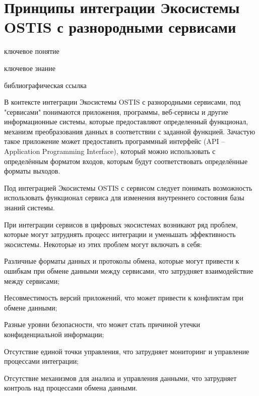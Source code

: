 \section{Принципы интеграции Экосистемы OSTIS с разнородными сервисами}
{\label{sec_integration_services}} 

\begin{SCn}

    \bigskip
    
    \begin{scnrelfromlist}{ключевое понятие}
    \end{scnrelfromlist}
    
    \bigskip
    
    \begin{scnrelfromlist}{ключевое знание}
    \end{scnrelfromlist}
    
    \bigskip
    
    \begin{scnrelfromlist}{библиографическая ссылка}
    \end{scnrelfromlist}
    
\end{SCn}

В контексте интеграции Экосистемы OSTIS с разнородными сервисами, под "сервисами" понимаются приложения, программы, веб-сервисы и другие информационные системы, которые предоставляют определенный функционал, механизм преобразования данных в соответствии с заданной функцией. Зачастую такое приложение может предоставить программный интерфейс (API -- Application Programming Interface), который можно использовать с определённым форматом входов, которым будут соответствовать определённые форматы выходов.

Под интеграцией Экосистемы OSTIS с сервисом следует понимать возможность использовать функционал сервиса для изменения внутреннего состояния базы знаний системы. 

При интеграции сервисов в цифровых экосистемах возникают ряд проблем, которые могут затруднять процесс интеграции и уменьшать эффективность экосистемы. Некоторые из этих проблем могут включать в себя:

\begin{textitemize}
    \item Различные форматы данных и протоколы обмена, которые могут привести к ошибкам при обмене данными между сервисами, что затрудняет взаимодействие между сервисами;
    \item Несовместимость версий приложений, что может привести к конфликтам при обмене данными;
    \item Разные уровни безопасности, что может стать причиной утечки конфиденциальной информации;
    \item Отсутствие единой точки управления, что затрудняет мониторинг и управление процессами интеграции;
    \item Отсутствие механизмов для анализа и управления данными, что затрудняет контроль над процессами обмена данными.
\end{textitemize}

